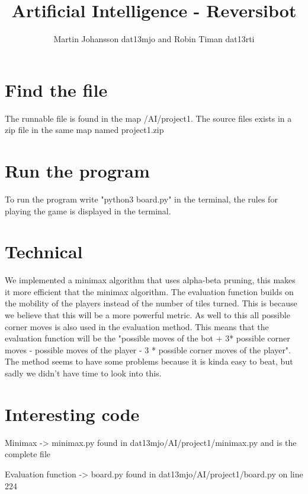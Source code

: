 \documentclass[a4paper]{article}
\begin{document}
\title{Artificial Intelligence - Reversibot}
\author{Martin Johansson dat13mjo and Robin Timan dat13rti}
\maketitle

\section{Find the file}

The runnable file is found in the map /AI/project1. The source files exists in a zip file in the same map named project1.zip

\section{Run the program}
To run the program write "python3 board.py" in the terminal, the rules for playing the game is displayed in the terminal.

\section{Technical}

We implemented a minimax algorithm that uses alpha-beta pruning, this makes it more efficient that the minimax algorithm. The evaluation function builds on the mobility of the players instead of the number of tiles turned. This is because we believe that this will be a more powerful metric. As well to this all possible corner moves is also used in the evaluation method. This means that the evaluation function will be the "possible moves of the bot + 3* possible corner moves - possible moves of the player - 3 * possible corner moves of the player". The method seems to have some problems because it is kinda easy to beat, but sadly we didn't have time to look into this.

\section{Interesting code}

Minimax -> minimax.py found in dat13mjo/AI/project1/minimax.py and is the complete file

Evaluation function -> board.py found in dat13mjo/AI/project1/board.py on line 224
\end{document}
